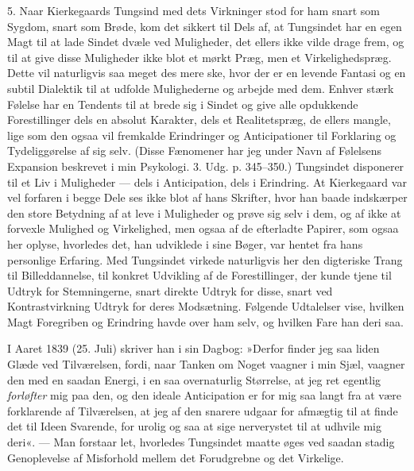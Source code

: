 \documentclass[12pt,a4paper,openany]{book}
\newcommand{\opage}[1]{\marginnote{\footnotesize\textit{[#1]}}}
\begin{document}
\opage{41}5. Naar Kierkegaards Tungsind med dets Virkninger
stod for ham snart som Sygdom, snart som Brøde, kom
det sikkert til Dels af, at Tungsindet har en egen Magt
til at lade Sindet dvæle ved Muligheder, det ellers ikke
vilde drage frem, og til at give disse Muligheder ikke
blot et mørkt Præg, men et Virkelighedspræg. Dette vil
naturligvis saa meget des mere ske, hvor der er en
levende Fantasi og en subtil Dialektik til at udfolde
Mulighederne og arbejde med dem. Enhver stærk Følelse
har en Tendents til at brede sig i Sindet og give alle
opdukkende Forestillinger dels en absolut Karakter, dels
et Realitetspræg, de ellers mangle, lige som den ogsaa
vil fremkalde Erindringer og Anticipationer til Forklaring
og Tydeliggørelse af sig selv. (Disse Fænomener har jeg
under Navn af Følelsens Expansion beskrevet i min
Psykologi. 3. Udg. p. 345--350.) Tungsindet disponerer
til et Liv i Muligheder --- dels i Anticipation, dels i
Erindring. At Kierkegaard var vel forfaren i begge
Dele ses ikke blot af hans Skrifter, hvor han baade indskærper
den store Betydning af at leve i Muligheder og
prøve sig selv i dem, og af ikke at forvexle Mulighed og
Virkelighed, men ogsaa af de efterladte Papirer, som ogsaa
her oplyse, hvorledes det, han udviklede i sine Bøger,
var hentet fra hans personlige Erfaring. Med Tungsindet
virkede naturligvis her den digteriske Trang til Billeddannelse,
til konkret Udvikling af de Forestillinger, der
kunde tjene til Udtryk for Stemningerne, snart direkte
Udtryk for disse, snart ved Kontrastvirkning Udtryk for
deres Modsætning. Følgende Udtalelser vise, hvilken
Magt Foregriben og Erindring havde over ham selv, og
hvilken Fare han deri saa.

I Aaret 1839 (25. Juli) skriver han i sin Dagbog:
»Derfor finder jeg saa liden Glæde ved Tilværelsen,
fordi, naar Tanken om Noget vaagner i min Sjæl,
\opage{42}vaagner den med en saadan Energi, i en saa overnaturlig
Størrelse, at jeg ret egentlig \textit{forløfter} mig paa den, og
den ideale Anticipation er for mig saa langt fra at være
forklarende af Tilværelsen, at jeg af den snarere udgaar
for afmægtig til at finde det til Ideen Svarende, for
urolig og saa at sige nerverystet til at udhvile mig deri«.
--- Man forstaar let, hvorledes Tungsindet maatte øges
ved saadan stadig Genoplevelse af Misforhold mellem det
Forudgrebne og det Virkelige.
\end{document}
